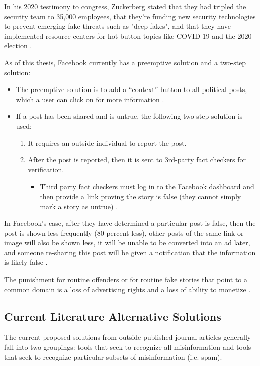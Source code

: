 \documentclass[preprint,review,12pt]{elsarticle}
\begin{document}
In his 2020 testimony to congress, Zuckerberg stated that they had tripled the security team to 35,000 employees, that they're funding new security technologies to prevent emerging fake threats such as "deep fakes", and that they have implemented resource centers for hot button topics like COVID-19 and the 2020 election \cite{zuckerberg2020}.


As of this thesis, Facebook currently has a preemptive solution and a two-step solution:
\renewcommand{\labelenumii}{\Roman{enumii}}
\begin{itemize}
\item The preemptive solution is to add a “context” button to all political posts, which a user can click on for more information \cite{smith2018designing}.
 \item If a post has been shared and is untrue, the following two-step solution is used:
 \begin{enumerate}
     \item It requires an outside individual to report the post. 
     \item After the post is reported, then it is  sent to 3rd-party fact checkers for verification. 
     \begin{itemize}
     \item Third party fact checkers must log in to the Facebook dashboard and then provide a link proving the story is false (they cannot simply mark a story as untrue) \cite{owen2016clamping}.
     \end{itemize}
 \end{enumerate}
 \end{itemize}
 
 In Facebook’s case, after they have determined a particular post is false, then the post is shown less frequently (80 percent less), other posts of the same link or image will also be shown less, it will be unable to be converted into an ad later, and someone re-sharing this post will be given a notification that the information is likely false \cite{owen2016clamping,facebook2020fact}.
 
 The punishment for routine offenders or for routine fake stories that point to a common domain is a loss of advertising rights and a loss of ability to monetize \cite{facebook2020fact}.
 
 \subsection{Current Literature Alternative Solutions}
 \label{sec: literature review}
 The current proposed solutions from outside published journal articles generally fall into two groupings: tools that seek to recognize all misinformation and tools that seek to recognize particular subsets of misinformation (i.e. spam).
\end{document}
